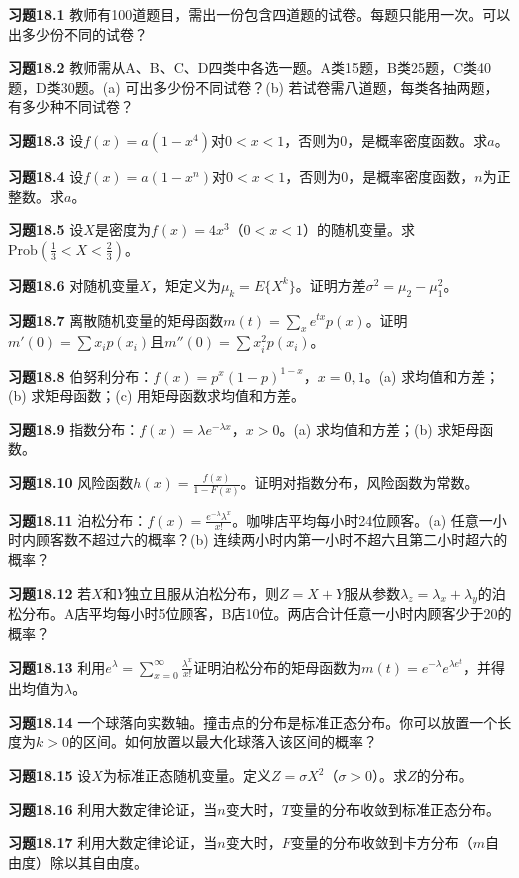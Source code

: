 \begin{translation}
\textbf{习题18.1} 教师有100道题目，需出一份包含四道题的试卷。每题只能用一次。可以出多少份不同的试卷？

\textbf{习题18.2} 教师需从A、B、C、D四类中各选一题。A类15题，B类25题，C类40题，D类30题。(a) 可出多少份不同试卷？(b) 若试卷需八道题，每类各抽两题，有多少种不同试卷？

\textbf{习题18.3} 设$f(x) = a(1 - x^4)$对$0 < x < 1$，否则为$0$，是概率密度函数。求$a$。

\textbf{习题18.4} 设$f(x) = a(1 - x^n)$对$0 < x < 1$，否则为$0$，是概率密度函数，$n$为正整数。求$a$。

\textbf{习题18.5} 设$X$是密度为$f(x) = 4x^3$（$0 < x < 1$）的随机变量。求$\text{Prob}(\frac{1}{3} < X < \frac{2}{3})$。

\textbf{习题18.6} 对随机变量$X$，矩定义为$\mu_k = E\{X^k\}$。证明方差$\sigma^2 = \mu_2 - \mu_1^2$。

\textbf{习题18.7} 离散随机变量的矩母函数$m(t) = \sum_x e^{tx} p(x)$。证明$m'(0) = \sum x_i p(x_i)$且$m''(0) = \sum x_i^2 p(x_i)$。

\textbf{习题18.8} 伯努利分布：$f(x) = p^x(1-p)^{1-x}$，$x = 0, 1$。(a) 求均值和方差；(b) 求矩母函数；(c) 用矩母函数求均值和方差。

\textbf{习题18.9} 指数分布：$f(x) = \lambda e^{-\lambda x}$，$x > 0$。(a) 求均值和方差；(b) 求矩母函数。

\textbf{习题18.10} 风险函数$h(x) = \frac{f(x)}{1 - F(x)}$。证明对指数分布，风险函数为常数。

\textbf{习题18.11} 泊松分布：$f(x) = \frac{e^{-\lambda}\lambda^x}{x!}$。咖啡店平均每小时24位顾客。(a) 任意一小时内顾客数不超过六的概率？(b) 连续两小时内第一小时不超六且第二小时超六的概率？

\textbf{习题18.12} 若$X$和$Y$独立且服从泊松分布，则$Z = X + Y$服从参数$\lambda_z = \lambda_x + \lambda_y$的泊松分布。A店平均每小时5位顾客，B店10位。两店合计任意一小时内顾客少于20的概率？

\textbf{习题18.13} 利用$e^\lambda = \sum_{x=0}^{\infty} \frac{\lambda^x}{x!}$证明泊松分布的矩母函数为$m(t) = e^{-\lambda}e^{\lambda e^t}$，并得出均值为$\lambda$。

\textbf{习题18.14} 一个球落向实数轴。撞击点的分布是标准正态分布。你可以放置一个长度为$k > 0$的区间。如何放置以最大化球落入该区间的概率？

\textbf{习题18.15} 设$X$为标准正态随机变量。定义$Z = \sigma X^2$（$\sigma > 0$）。求$Z$的分布。

\textbf{习题18.16} 利用大数定律论证，当$n$变大时，$T$变量的分布收敛到标准正态分布。

\textbf{习题18.17} 利用大数定律论证，当$n$变大时，$F$变量的分布收敛到卡方分布（$m$自由度）除以其自由度。
\end{translation}

